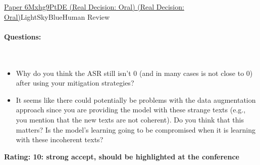 \documentclass{article} %
\begin{document}
\begin{reviewbox}{\href{https://openreview.net/forum?id=6Mxhg9PtDE}{Paper 6Mxhg9PtDE (Real Decision: Oral) (Real Decision: Oral)}}{LightSkyBlue}{Human Review}
\paragraph{Questions:}\leavevmode\\[0.1em]
\begin{itemize}
    \item Why do you think the ASR still isn’t 0 (and in many cases is not close to 0) after using your mitigation strategies?
    \item It seems like there could potentially be problems with the data augmentation approach since you are providing the model with these strange texts (e.g., you mention that the new texts are not coherent). Do you think that this matters? Is the model’s learning going to be compromised when it is learning with these incoherent texts?
\end{itemize}

\textbf{Rating: 10: strong accept, should be highlighted at the conference}
\end{reviewbox}
\end{document}
